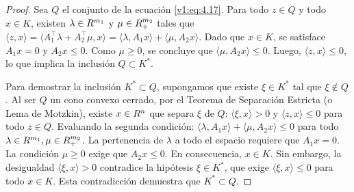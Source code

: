 \begin{proof}
 Sea $Q$ el conjunto de la ecuación \eqref{v1:eq:4.17}. Para todo $z \in Q$ y todo $x \in K$, existen $\lambda \in R^{m_1}$ y $\mu \in R_+^{m_2}$ tales que $\langle z, x \rangle = \langle A_1^\top \lambda + A_2^\top \mu, x \rangle = \langle \lambda, A_1 x \rangle + \langle \mu, A_2 x \rangle$. Dado que $x \in K$, se satisface $A_1 x = 0$ y $A_2 x \le 0$. Como $\mu \ge 0$, se concluye que $\langle \mu, A_2 x \rangle \le 0$. Luego, $\langle z, x \rangle \le 0$, lo que implica la inclusión $Q \subset K^*$.

 Para demostrar la inclusión $K^* \subset Q$, supongamos que existe $\xi \in K^*$ tal que $\xi \notin Q$. Al ser $Q$ un cono convexo cerrado, por el Teorema de Separación Estricta (o Lema de Motzkin), existe $x \in R^n$ que separa $\xi$ de $Q$: $\langle \xi, x \rangle > 0$ y $\langle z, x \rangle \le 0$ para todo $z \in Q$. Evaluando la segunda condición: $\langle \lambda, A_1 x \rangle + \langle \mu, A_2 x \rangle \le 0$ para todo $\lambda \in R^{m_1}, \mu \in R_+^{m_2}$. La pertenencia de $\lambda$ a todo el espacio requiere que $A_1 x = 0$. La condición $\mu \ge 0$ exige que $A_2 x \le 0$. En consecuencia, $x \in K$. Sin embargo, la desigualdad $\langle \xi, x \rangle > 0$ contradice la hipótesis $\xi \in K^*$, que exige $\langle \xi, x \rangle \le 0$ para todo $x \in K$. Esta contradicción demuestra que $K^* \subset Q$.
\end{proof}

